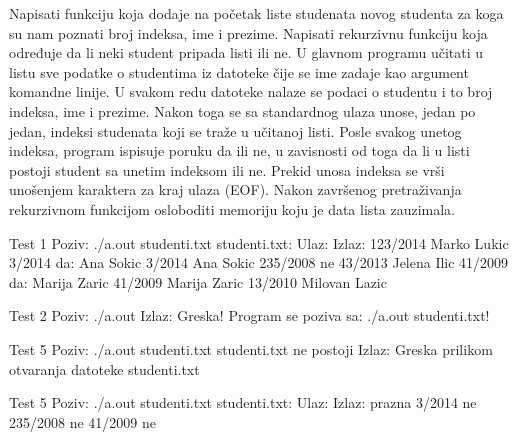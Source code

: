 \begin{Exercise}[label=609]
Napisati funkciju koja dodaje na početak liste studenata novog studenta za koga su nam poznati broj indeksa, ime
i prezime. 
Napisati rekurzivnu funkciju koja određuje da li neki student pripada listi ili ne.
U glavnom programu učitati u listu sve podatke o studentima iz datoteke čije se ime zadaje kao argument komandne linije. U svakom redu datoteke nalaze se podaci o studentu i to broj indeksa, ime
i prezime.
Nakon toga se sa standardnog ulaza unose, jedan po jedan, indeksi studenata koji se traže u učitanoj listi. Posle svakog unetog indeksa, program ispisuje poruku da ili ne,
u zavisnosti od toga da li u listi postoji student sa unetim indeksom ili ne. Prekid unosa indeksa se vrši unošenjem karaktera za kraj ulaza (EOF).
Nakon završenog pretraživanja rekurzivnom funkcijom osloboditi memoriju koju je data lista zauzimala.


\noindent
\begin{maxitest}
\begin{test}{Test 1}
Poziv: ./a.out studenti.txt
studenti.txt:                 Ulaz:           Izlaz:
123/2014 Marko Lukic          3/2014          da: Ana Sokic
3/2014 Ana Sokic              235/2008        ne
43/2013 Jelena Ilic           41/2009         da: Marija Zaric
41/2009 Marija Zaric
13/2010 Milovan Lazic
\end{test}
\end{maxitest}
\begin{miditest}
\begin{test}{Test 2}
Poziv: ./a.out
Izlaz: 
  Greska! Program se poziva sa: 
  ./a.out studenti.txt!
\end{test}
\end{miditest}
\begin{miditest}
\begin{test}{Test 5}
Poziv: ./a.out  studenti.txt
studenti.txt ne postoji
Izlaz: 
  Greska prilikom otvaranja 
  datoteke studenti.txt
\end{test}
\end{miditest}	
\begin{maxitest}
\begin{test}{Test 5}
Poziv: ./a.out  studenti.txt
studenti.txt:             Ulaz:       Izlaz:
  prazna                  3/2014      ne
                          235/2008    ne
                          41/2009     ne
\end{test}
\end{maxitest}
\end{Exercise}
\begin{Answer}[ref=609]
\end{Answer}


